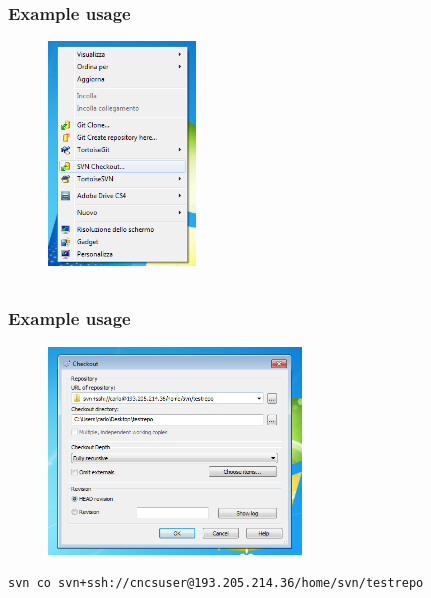 \documentclass[10pt]{beamer}
\begin{document}
\begin{frame}[fragile]
\frametitle{Example usage}
\begin{figure}[h]
 \centering
 \includegraphics[width=0.35\textwidth]{images/image1.png}
\end{figure}
\begin{verbatim}

\end{verbatim}
\end{frame}

\begin{frame}[fragile]
\frametitle{Example usage}
\begin{figure}[h]
 \centering
 \includegraphics[width=0.6\textwidth]{images/image2.png}
\end{figure}
\begin{verbatim}
svn co svn+ssh://cncsuser@193.205.214.36/home/svn/testrepo 
\end{verbatim}
\end{frame}
\end{document}

